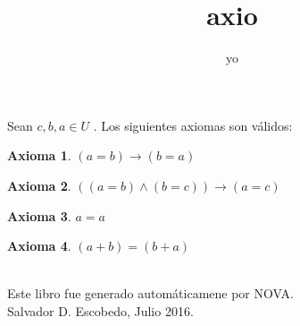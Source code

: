 ﻿\documentclass[12pt]{book}
\title{axio}
\author{yo}
\date{}
\newtheorem{axiom}{Axioma}[chapter]
\begin{document}
\maketitle

Sean $c,b,a\in U$
. 
Los siguientes axiomas son válidos: 
\begin{axiom}
$(a=b)\rightarrow (b=a)$
\end{axiom}
\begin{axiom}
$((a=b)\wedge (b=c))\rightarrow (a=c)$
\end{axiom}
\begin{axiom}
$a=a$
\end{axiom}
\begin{axiom}
$(a+b)=(b+a)$
\end{axiom}
\label{ax: 0}
\\\small{Este libro fue generado automáticamene por NOVA.} \\
\small{Salvador D. Escobedo, Julio 2016}.
\end{document}
